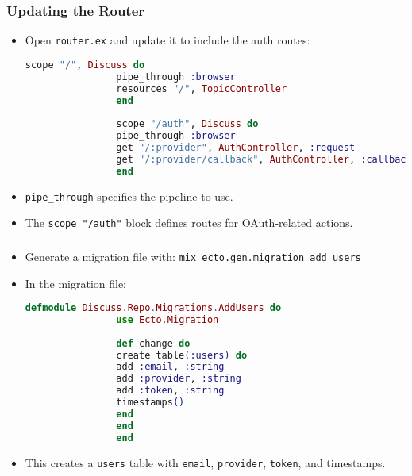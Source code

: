 \documentclass[aspectratio=169, table]{beamer}
\begin{document}
	\begin{frame}[fragile]
		\frametitle{Updating the Router}
		\begin{itemize}
			\item Open \texttt{router.ex} and update it to include the auth routes:
			\begin{lstlisting}[language=Elixir]
				scope "/", Discuss do
				pipe_through :browser
				resources "/", TopicController
				end
				
				scope "/auth", Discuss do
				pipe_through :browser
				get "/:provider", AuthController, :request
				get "/:provider/callback", AuthController, :callback
				end
			\end{lstlisting}
			\item \texttt{pipe\_through} specifies the pipeline to use.
			\item The \texttt{scope "/auth"} block defines routes for OAuth-related actions.
		\end{itemize}
	\end{frame}
	
	\begin{frame}[fragile]
		\frametitle{}
		\begin{itemize}
			\item Generate a migration file with:
			\texttt{mix ecto.gen.migration add\_users}
			\item In the migration file:
			\begin{lstlisting}[language=Elixir]
				defmodule Discuss.Repo.Migrations.AddUsers do
				use Ecto.Migration
				
				def change do
				create table(:users) do
				add :email, :string
				add :provider, :string
				add :token, :string
				timestamps()
				end
				end
				end
			\end{lstlisting}
			\item This creates a \texttt{users} table with \texttt{email}, \texttt{provider}, \texttt{token}, and timestamps.
		\end{itemize}
	\end{frame}
	
\end{document}
